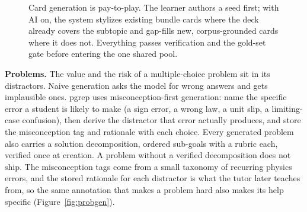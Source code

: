 \documentclass[11pt]{article}
\begin{document}
\begin{figure}[t]
\centering
{}
\caption{Card generation is pay-to-play. The learner authors a seed first; with AI on,
the system stylizes existing bundle cards where the deck already covers the subtopic and
gap-fills new, corpus-grounded cards where it does not. Everything passes verification
and the gold-set gate before entering the one shared pool.}
\label{fig:cardgen}
\end{figure}

\textbf{Problems.} The value and the risk of a multiple-choice problem sit in its
distractors. Naive generation asks the model for wrong answers and gets implausible
ones. pgrep uses misconception-first generation: name the specific error a student is
likely to make (a sign error, a wrong law, a unit slip, a limiting-case confusion),
then derive the distractor that error actually produces, and store the misconception
tag and rationale with each choice. Every generated problem also carries a solution
decomposition, ordered sub-goals with a rubric each, verified once at creation. A
problem without a verified decomposition does not ship. The misconception tags come from
a small taxonomy of recurring physics errors, and the stored rationale for each
distractor is what the tutor later teaches from, so the same annotation that makes a
problem hard also makes its help specific (Figure~\ref{fig:probgen}).
\end{document}
